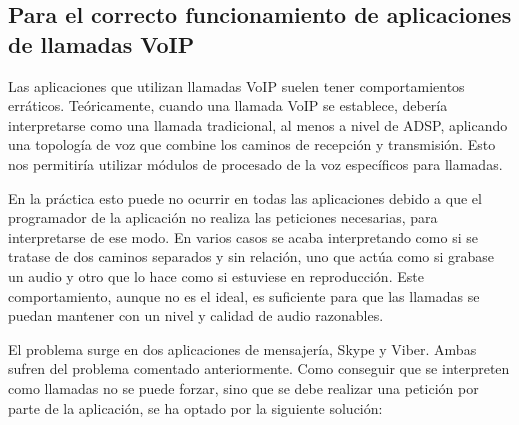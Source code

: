 \subsection{Para el correcto funcionamiento de aplicaciones de llamadas VoIP} \label{sec:llamadas_VoIP}
Las aplicaciones que utilizan llamadas \gls{VoIP} suelen tener comportamientos erráticos. Teóricamente, cuando una llamada \gls{VoIP} se establece, debería interpretarse como una llamada tradicional, al menos a nivel de \gls{ADSP}, aplicando una topología de voz que combine los caminos de recepción y transmisión. Esto nos permitiría utilizar módulos de procesado de la voz específicos para llamadas.

En la práctica esto puede no ocurrir en todas las aplicaciones debido a que el programador de la aplicación no realiza las peticiones necesarias, para interpretarse de ese modo. En varios casos se acaba interpretando como si se tratase de dos caminos separados y sin relación, uno que actúa como si grabase un audio y otro que lo hace como si estuviese en reproducción. Este comportamiento, aunque no es el ideal, es suficiente para que las llamadas se puedan mantener con un nivel y calidad de audio razonables.

El problema surge en dos aplicaciones de mensajería, Skype y Viber. Ambas sufren del problema comentado anteriormente. Como conseguir que se interpreten como llamadas no se puede forzar, sino que se debe realizar una petición por parte de la aplicación, se ha optado por la siguiente solución:
	
